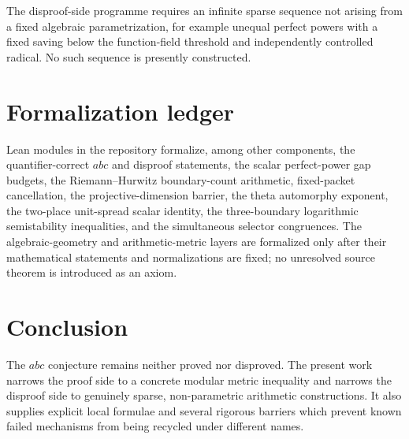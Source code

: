 \documentclass[11pt]{article}
\theoremstyle{definition}
\theoremstyle{remark}
\begin{document}
The disproof-side programme requires an infinite sparse sequence not arising
from a fixed algebraic parametrization, for example unequal perfect powers with
a fixed saving below the function-field threshold and independently controlled
radical.  No such sequence is presently constructed.

\section{Formalization ledger}

Lean modules in the repository formalize, among other components, the
quantifier-correct $abc$ and disproof statements, the scalar perfect-power gap
budgets, the Riemann--Hurwitz boundary-count arithmetic, fixed-packet
cancellation, the projective-dimension barrier, the theta automorphy exponent,
the two-place unit-spread scalar identity, the three-boundary logarithmic
semistability inequalities, and the simultaneous selector congruences.  The
algebraic-geometry and arithmetic-metric layers are formalized only after their
mathematical statements and normalizations are fixed; no unresolved source
theorem is introduced as an axiom.

\section{Conclusion}

The $abc$ conjecture remains neither proved nor disproved.  The present work
narrows the proof side to a concrete modular metric inequality and narrows the
disproof side to genuinely sparse, non-parametric arithmetic constructions.
It also supplies explicit local formulae and several rigorous barriers which
prevent known failed mechanisms from being recycled under different names.
\end{document}
